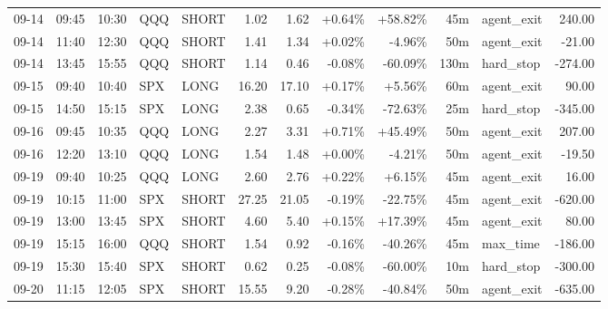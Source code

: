 \documentclass[11pt,a4paper,twoside]{article}
\begin{document}
\begin{center}
\begin{longtable}{>{\color{txtmain}}l l l l l r r r r r >{\color{txtmain}}l r}
09-14 & 09:45 & 10:30 & QQQ & SHORT & 1.02 & 1.62 & \textcolor{wingreen}{+0.64\%} & \textcolor{wingreen}{+58.82\%} & 45m & agent\_exit & \textcolor{wingreen}{240.00} \\
09-14 & 11:40 & 12:30 & QQQ & SHORT & 1.41 & 1.34 & \textcolor{wingreen}{+0.02\%} & \textcolor{lossred}{-4.96\%} & 50m & agent\_exit & \textcolor{lossred}{-21.00} \\
09-14 & 13:45 & 15:55 & QQQ & SHORT & 1.14 & 0.46 & \textcolor{lossred}{-0.08\%} & \textcolor{lossred}{-60.09\%} & 130m & hard\_stop & \textcolor{lossred}{-274.00} \\
09-15 & 09:40 & 10:40 & SPX & LONG & 16.20 & 17.10 & \textcolor{wingreen}{+0.17\%} & \textcolor{wingreen}{+5.56\%} & 60m & agent\_exit & \textcolor{wingreen}{90.00} \\
09-15 & 14:50 & 15:15 & SPX & LONG & 2.38 & 0.65 & \textcolor{lossred}{-0.34\%} & \textcolor{lossred}{-72.63\%} & 25m & hard\_stop & \textcolor{lossred}{-345.00} \\
09-16 & 09:45 & 10:35 & QQQ & LONG & 2.27 & 3.31 & \textcolor{wingreen}{+0.71\%} & \textcolor{wingreen}{+45.49\%} & 50m & agent\_exit & \textcolor{wingreen}{207.00} \\
09-16 & 12:20 & 13:10 & QQQ & LONG & 1.54 & 1.48 & \textcolor{wingreen}{+0.00\%} & \textcolor{lossred}{-4.21\%} & 50m & agent\_exit & \textcolor{lossred}{-19.50} \\
09-19 & 09:40 & 10:25 & QQQ & LONG & 2.60 & 2.76 & \textcolor{wingreen}{+0.22\%} & \textcolor{wingreen}{+6.15\%} & 45m & agent\_exit & \textcolor{wingreen}{16.00} \\
09-19 & 10:15 & 11:00 & SPX & SHORT & 27.25 & 21.05 & \textcolor{lossred}{-0.19\%} & \textcolor{lossred}{-22.75\%} & 45m & agent\_exit & \textcolor{lossred}{-620.00} \\
09-19 & 13:00 & 13:45 & SPX & SHORT & 4.60 & 5.40 & \textcolor{wingreen}{+0.15\%} & \textcolor{wingreen}{+17.39\%} & 45m & agent\_exit & \textcolor{wingreen}{80.00} \\
09-19 & 15:15 & 16:00 & QQQ & SHORT & 1.54 & 0.92 & \textcolor{lossred}{-0.16\%} & \textcolor{lossred}{-40.26\%} & 45m & max\_time & \textcolor{lossred}{-186.00} \\
09-19 & 15:30 & 15:40 & SPX & SHORT & 0.62 & 0.25 & \textcolor{lossred}{-0.08\%} & \textcolor{lossred}{-60.00\%} & 10m & hard\_stop & \textcolor{lossred}{-300.00} \\
09-20 & 11:15 & 12:05 & SPX & SHORT & 15.55 & 9.20 & \textcolor{lossred}{-0.28\%} & \textcolor{lossred}{-40.84\%} & 50m & agent\_exit & \textcolor{lossred}{-635.00} \\

\end{longtable}
\end{center}
\end{document}
